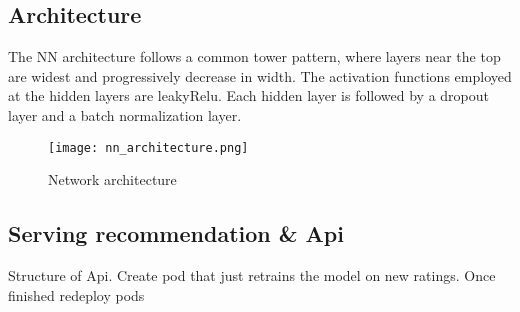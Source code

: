 \subsection{Architecture}
The NN architecture follows a common tower pattern, where layers near the top are widest and progressively decrease in width. The activation functions employed at the hidden layers are leakyRelu. Each hidden layer is followed by a dropout layer and a batch normalization layer.

\begin{figure}[h!]
    \texttt{[image: nn\_architecture.png]}
    \caption{Network architecture}
\end{figure}



\subsection{Serving recommendation \& Api}
Structure of Api.
Create pod that just retrains the model on new ratings. Once finished redeploy pods